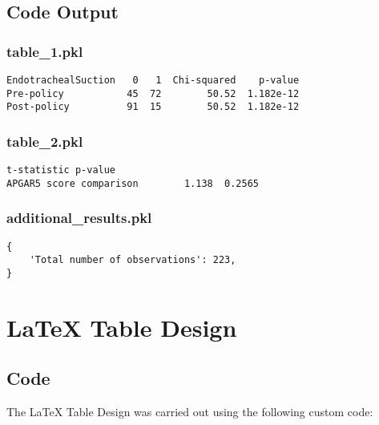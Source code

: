 \documentclass[11pt]{article}
\begin{document}
\subsection{Code Output}

\subsubsection*{table\_1.pkl}

\begin{Verbatim}[tabsize=4]
EndotrachealSuction   0   1  Chi-squared    p-value
Pre-policy           45  72        50.52  1.182e-12
Post-policy          91  15        50.52  1.182e-12
\end{Verbatim}

\subsubsection*{table\_2.pkl}

\begin{Verbatim}[tabsize=4]
                         t-statistic p-value
APGAR5 score comparison        1.138  0.2565
\end{Verbatim}

\subsubsection*{additional\_results.pkl}

\begin{Verbatim}[tabsize=4]
{
    'Total number of observations': 223,
}
\end{Verbatim}

\section{LaTeX Table Design} \subsection{Code}The LaTeX Table Design was carried out using the following custom code:
\end{document}
